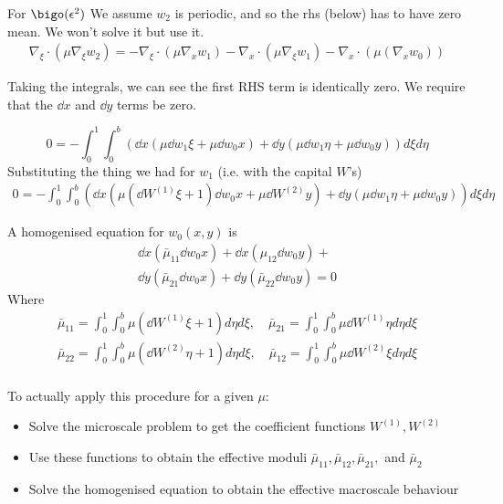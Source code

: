 \documentclass{X:/Documents/Coding/Latex/myassignment}
\begin{document}
For $\bigo(\epsilon^2)$ We assume $w_2$ is periodic, and so the rhs (below) has to have zero mean. We won't solve it but use it.
\begin{align*}
    \nabla_\xi \cdot (\mu \nabla_\xi w_2) = -\nabla_\xi \cdot (\mu\nabla_x w_1) - \nabla_x \cdot(\mu \nabla_{\xi} w_1) - \nabla_x \cdot (\mu(\nabla_x w_0))
\end{align*}

Taking the integrals, we can see the first RHS term is identically zero. We require that the $\dd{}x$ and $\dd{}y$ terms be zero.

\[0 = -\int_0^1 \int_0^b \left(\dd{}x \left(\mu \dd{w_1}{\xi} + \mu \dd{w_0}x\right) + \dd{}y\left(\mu \dd{w_1}{\eta} + \mu \dd{w_0}y\right)\right) d\xi d\eta \]
Substituting the thing we had for $w_1$ (i.e. with the capital $W$'s)
\begin{align*}
    0 = -\int_0^1 \int_0^b \left(\dd{}x \left(\mu \left(\dd{W^{(1)}}{\xi} + 1\right) \dd{w_0}x + \mu \dd{W^{(2)}}y\right) + \dd{}y\left(\mu \dd{w_1}{\eta} + \mu \dd{w_0}y\right)\right) d\xi d\eta 
\end{align*}


A homogenised equation for $w_0(x,y)$ is
\begin{align*}
    \dd{}x \left(\bar{\mu}_{11} \dd{w_0}{x}\right) + \dd{}{x} \left(\mu_{12} \dd{w_0}{y}\right) +\\
    \dd{}y \left(\bar{\mu}_{21} \dd{w_0}{x}\right) + \dd{}y \left(\bar{\mu}_{22} \dd{w_0}{y}\right) =0
\end{align*}
Where
\begin{align*}
    \bar{\mu}_{11} = \int_0^1\int_0^b \mu \left(\dd{W^{(1)}}{\xi} + 1\right) d\eta d\xi , \quad 
    \bar{\mu}_{21} = \int_0^1\int_0^b \mu  \dd{W^{(1)}}{\eta} d\eta d\xi \\
    \bar{\mu}_{22} = \int_0^1\int_0^b \mu \left(\dd{W^{(2)}}{\eta} + 1\right) d\eta d\xi , \quad 
    \bar{\mu}_{12} = \int_0^1\int_0^b \mu  \dd{W^{(2)}}{\xi} d\eta d\xi \\
\end{align*}


To actually apply this procedure for a given $\mu$:
\begin{itemize}
    \item Solve the microscale problem to get the coefficient functions $W^{(1)}, W^{(2)}$
    \item Use these functions to obtain the effective moduli $\bar{\mu}_{11},\bar{\mu}_{12},\bar{\mu}_{21},$ and $\bar{\mu}_{2}$
    \item Solve the homogenised equation to obtain the effective macroscale behaviour
\end{itemize}
\end{document}

